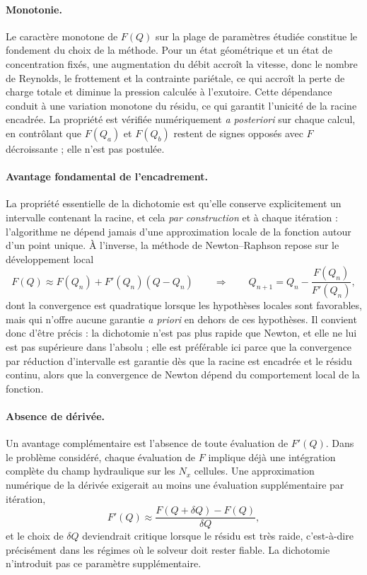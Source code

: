 \documentclass[11pt,a4paper]{report}
\begin{document}
\paragraph{Monotonie.} Le caractère monotone de \(F(Q)\) sur la plage de paramètres étudiée constitue le
fondement du choix de la méthode. Pour un état géométrique et un état de concentration fixés, une
augmentation du débit accroît la vitesse, donc le nombre de Reynolds, le frottement et la contrainte
pariétale, ce qui accroît la perte de charge totale et diminue la pression calculée à l'exutoire. Cette
dépendance conduit à une variation monotone du résidu, ce qui garantit l'unicité de la racine encadrée.
La propriété est vérifiée numériquement \emph{a posteriori} sur chaque calcul, en contrôlant que
\(F(Q_a)\) et \(F(Q_b)\) restent de signes opposés avec \(F\) décroissante ; elle n'est pas postulée.

\paragraph{Avantage fondamental de l'encadrement.} La propriété essentielle de la dichotomie est qu'elle
conserve explicitement un intervalle contenant la racine, et cela \emph{par construction} et à chaque
itération : l'algorithme ne dépend jamais d'une approximation locale de la fonction autour d'un point
unique. À l'inverse, la méthode de Newton--Raphson repose sur le développement local
\begin{equation}
F(Q) \approx F(Q_n) + F'(Q_n)\left(Q-Q_n\right)
\qquad\Longrightarrow\qquad
Q_{n+1} = Q_n - \frac{F(Q_n)}{F'(Q_n)},
\label{eq:newton}
\end{equation}
dont la convergence est quadratique lorsque les hypothèses locales sont favorables, mais qui n'offre aucune
garantie \emph{a priori} en dehors de ces hypothèses. Il convient donc d'être précis : la dichotomie n'est
pas plus rapide que Newton, et elle ne lui est pas supérieure dans l'absolu ; elle est préférable ici
parce que la convergence par réduction d'intervalle est garantie dès que la racine est encadrée et le
résidu continu, alors que la convergence de Newton dépend du comportement local de la fonction.

\paragraph{Absence de dérivée.} Un avantage complémentaire est l'absence de toute évaluation de \(F'(Q)\).
Dans le problème considéré, chaque évaluation de \(F\) implique déjà une intégration complète du champ
hydraulique sur les \(N_x\) cellules. Une approximation numérique de la dérivée exigerait au moins une
évaluation supplémentaire par itération,
\begin{equation}
F'(Q) \approx \frac{F(Q+\delta Q) - F(Q)}{\delta Q},
\label{eq:derivee-num}
\end{equation}
et le choix de \(\delta Q\) deviendrait critique lorsque le résidu est très raide, c'est-à-dire précisément
dans les régimes où le solveur doit rester fiable. La dichotomie n'introduit pas ce paramètre
supplémentaire.
\end{document}
